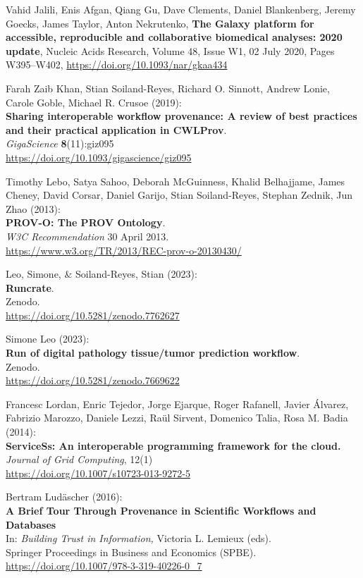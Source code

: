 \documentclass[10pt,letterpaper]{article}
\begin{document}
\begin{thebibliography}{10}
 Vahid Jalili, Enis Afgan, Qiang Gu, Dave Clements,
Daniel Blankenberg, Jeremy Goecks, James Taylor, Anton Nekrutenko,
\textbf{The Galaxy platform for accessible, reproducible and
collaborative biomedical analyses: 2020 update}, Nucleic Acids Research,
Volume 48, Issue W1, 02 July 2020, Pages W395--W402,
\url{https://doi.org/10.1093/nar/gkaa434}

 Farah Zaib Khan, Stian Soiland-Reyes, Richard O.
Sinnott, Andrew Lonie, Carole Goble, Michael R. Crusoe (2019):\\
\textbf{Sharing interoperable workflow provenance: A review of best
practices and their practical application in CWLProv}.\\
\emph{GigaScience} \textbf{8}(11):giz095\\
\url{https://doi.org/10.1093/gigascience/giz095}

 Timothy Lebo, Satya Sahoo, Deborah McGuinness, Khalid
Belhajjame, James Cheney, David Corsar, Daniel Garijo, Stian
Soiland-Reyes, Stephan Zednik, Jun Zhao (2013):\\
\textbf{PROV-O: The PROV Ontology}.\\
\emph{W3C Recommendation} 30 April 2013.\\
\url{https://www.w3.org/TR/2013/REC-prov-o-20130430/}

 Leo, Simone, \& Soiland-Reyes, Stian (2023):\\
\textbf{Runcrate}.\\
Zenodo.\\
\url{https://doi.org/10.5281/zenodo.7762627}

 Simone Leo (2023):\\
\textbf{Run of digital pathology tissue/tumor prediction workflow}.\\
Zenodo.\\
\url{https://doi.org/10.5281/zenodo.7669622}

 Francesc Lordan, Enric Tejedor, Jorge Ejarque, Roger
Rafanell, Javier Álvarez, Fabrizio Marozzo, Daniele Lezzi, Raül Sirvent,
Domenico Talia, Rosa M. Badia (2014):\\
\textbf{ServiceSs: An interoperable programming framework for the
cloud.}\\
\emph{Journal of Grid Computing}, 12(1)\\
\url{https://doi.org/10.1007/s10723-013-9272-5}

 Bertram Ludäscher (2016):\\
\textbf{A Brief Tour Through Provenance in Scientific Workflows and
Databases\\
}In: \emph{Building Trust in Information,} Victoria L. Lemieux (eds).\\
Springer Proceedings in Business and Economics (SPBE).\\
\url{https://doi.org/10.1007/978-3-319-40226-0_7}


\end{thebibliography}
\end{document}
